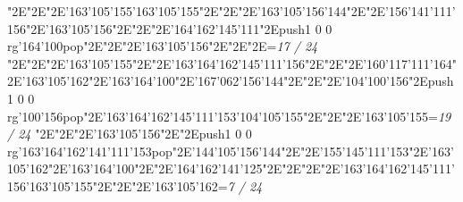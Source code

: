 \null\vfill\enskip\enskip\enskip\ipa\char"2E\enskip\enskip\enskip\ipa\char"2E\enskip\ipa\char"2E\ipa\char'163\ipa\char'105\ipa\char'155\bigskip\ipa\char'163\ipa\char'105\ipa\char'155\ipa\char"2E\enskip\enskip\enskip\ipa\char"2E\enskip\enskip\enskip\enskip\enskip\enskip\bigskip\enskip\enskip\ipa\char"2E\ipa\char'163\ipa\char'105\ipa\char'156\ipa\char'144\ipa\char"2E\enskip\ipa\char"2E\ipa\char'156\ipa\char'141\ipa\char'111\ipa\char'156\ipa\char"2E\ipa\char'163\ipa\char'105\ipa\char'156\ipa\char"2E\enskip\enskip\enskip\ipa\char"2E\enskip\enskip\enskip\enskip\bigskip\enskip\ipa\char"2E\ipa\char'164\ipa\char'162\ipa\char'145\ipa\char'111\ipa\char"2E\pdfcolorstack\match push{1 0 0 rg}\ipa\char'164\ipa\char'100\pdfcolorstack\match pop{}\ipa\char"2E\enskip\enskip\enskip\ipa\char"2E\enskip\enskip\ipa\char"2E\enskip\enskip\enskip\enskip\enskip\enskip\bigskip\ipa\char'163\ipa\char'105\ipa\char'156\ipa\char"2E\enskip\enskip\ipa\char"2E\enskip\enskip\enskip\ipa\char"2E\enskip\enskip\enskip\bigskip\vfill\footline={\hfill\tenrm\it 17 / 24}\eject
\null\vfill\enskip\enskip\enskip\ipa\char"2E\enskip\enskip\enskip\ipa\char"2E\enskip\ipa\char"2E\enskip\enskip\enskip\bigskip\ipa\char'163\ipa\char'105\ipa\char'155\ipa\char"2E\enskip\enskip\enskip\ipa\char"2E\ipa\char'163\ipa\char'164\ipa\char'162\ipa\char'145\ipa\char'111\ipa\char'156\bigskip\enskip\enskip\ipa\char"2E\enskip\enskip\enskip\enskip\ipa\char"2E\enskip\ipa\char"2E\ipa\char'160\ipa\char'117\ipa\char'111\ipa\char'164\ipa\char"2E\ipa\char'163\ipa\char'105\ipa\char'162\ipa\char"2E\ipa\char'163\ipa\char'164\ipa\char'100\ipa\char"2E\ipa\char'167\ipa\char'062\ipa\char'156\ipa\char'144\bigskip\enskip\ipa\char"2E\enskip\enskip\enskip\enskip\ipa\char"2E\enskip\enskip\ipa\char"2E\ipa\char'104\ipa\char'100\ipa\char'156\ipa\char"2E\pdfcolorstack\match push{1 0 0 rg}\ipa\char'100\ipa\char'156\pdfcolorstack\match pop{}\ipa\char"2E\ipa\char'163\ipa\char'164\ipa\char'162\ipa\char'145\ipa\char'111\ipa\char'153\bigskip\ipa\char'104\ipa\char'105\ipa\char'155\ipa\char"2E\enskip\enskip\ipa\char"2E\enskip\enskip\enskip\ipa\char"2E\ipa\char'163\ipa\char'105\ipa\char'155\bigskip\vfill\footline={\hfill\tenrm\it 19 / 24}\eject
\null\vfill\enskip\enskip\enskip\ipa\char"2E\enskip\enskip\enskip\ipa\char"2E\enskip\ipa\char"2E\enskip\enskip\enskip\bigskip\ipa\char'163\ipa\char'105\ipa\char'156\ipa\char"2E\enskip\enskip\enskip\ipa\char"2E\pdfcolorstack\match push{1 0 0 rg}\ipa\char'163\ipa\char'164\ipa\char'162\ipa\char'141\ipa\char'111\ipa\char'153\pdfcolorstack\match pop{}\bigskip\enskip\enskip\ipa\char"2E\ipa\char'144\ipa\char'105\ipa\char'156\ipa\char'144\ipa\char"2E\enskip\ipa\char"2E\ipa\char'155\ipa\char'145\ipa\char'111\ipa\char'153\ipa\char"2E\ipa\char'163\ipa\char'105\ipa\char'162\ipa\char"2E\ipa\char'163\ipa\char'164\ipa\char'100\ipa\char"2E\enskip\enskip\enskip\enskip\bigskip\enskip\ipa\char"2E\ipa\char'164\ipa\char'162\ipa\char'141\ipa\char'125\ipa\char"2E\enskip\enskip\ipa\char"2E\enskip\enskip\enskip\ipa\char"2E\enskip\enskip\ipa\char"2E\ipa\char'163\ipa\char'164\ipa\char'162\ipa\char'145\ipa\char'111\ipa\char'156\bigskip\ipa\char'163\ipa\char'105\ipa\char'155\ipa\char"2E\enskip\enskip\ipa\char"2E\enskip\enskip\enskip\ipa\char"2E\ipa\char'163\ipa\char'105\ipa\char'162\bigskip\vfill\footline={\hfill\tenrm\it 7 / 24}\eject

